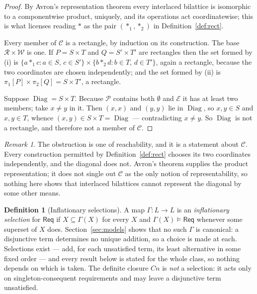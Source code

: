 \documentclass[11pt,reqno]{amsart}
\theoremstyle{plain}
\theoremstyle{definition}
\newtheorem{definition}[theorem]{Definition}
\theoremstyle{remark}
\newtheorem{remark}[theorem]{Remark}
\newcommand{\Pos}{\mathcal{P}}
\newcommand{\El}{\mathcal{E}}
\newcommand{\Law}{\mathsf{Req}}
\begin{document}
\begin{proof}
By Avron's representation theorem \cite{avron1996} every interlaced bilattice is
isomorphic to a componentwise product, uniquely, and its operations act
coordinatewise; this is what licenses reading $\ast$ as the pair
$(\ast_{1}, \ast_{2})$ in Definition~\ref{def:rect}.

Every member of $\mathcal{C}$ is a rectangle, by induction on its construction.
The base $\mathcal{R} \times \mathcal{W}$ is one. If $P = S \times T$ and
$Q = S' \times T'$ are rectangles then the set formed by (i) is
$\{a \ast_{1} c : a \in S,\, c \in S'\} \times \{b \ast_{2} d : b \in T,\,
d \in T'\}$, again a rectangle, because the two coordinates are chosen
independently; and the set formed by (ii) is $\pi_{1}[P] \times \pi_{2}[Q] =
S \times T'$, a rectangle.

Suppose $\operatorname{Diag} = S \times T$. Because $\Pos$ contains both
$\emptyset$ and $\El$ it has at least two members; take $x \neq y$ in it. Then
$(x,x)$ and $(y,y)$ lie in $\operatorname{Diag}$, so $x, y \in S$ and
$x, y \in T$, whence $(x,y) \in S \times T = \operatorname{Diag}$ ---
contradicting $x \neq y$. So $\operatorname{Diag}$ is not a rectangle, and
therefore not a member of $\mathcal{C}$.
\end{proof}

\begin{remark}
The obstruction is one of reachability, and it is a statement about
$\mathcal{C}$. Every construction permitted by Definition~\ref{def:rect} chooses
its two coordinates independently, and the diagonal does not. Avron's theorem
supplies the product representation; it does not single out $\mathcal{C}$ as the
only notion of representability, so nothing here shows that interlaced bilattices
cannot represent the diagonal by some other means.
\end{remark}

\begin{definition}[Inflationary selections]\label{def:gamma}
A map $\Gamma \colon L \to L$ is an \emph{inflationary selection} for $\Law$ if
$X \subseteq \Gamma(X)$ for every $X$ and $\Gamma(X) \models \Law$ whenever some
superset of $X$ does. Section~\ref{sec:models} shows that no such $\Gamma$ is canonical: a
disjunctive term determines no unique addition, so a choice is made at each.
Selections exist --- add, for each unsatisfied term, its least alternative in
some fixed order --- and every result below is stated for the whole class, so
nothing depends on which is taken. The definite closure $Cn$ is \emph{not} a
selection: it acts only on singleton-consequent requirements and may leave a
disjunctive term unsatisfied.
\end{definition}
\end{document}
